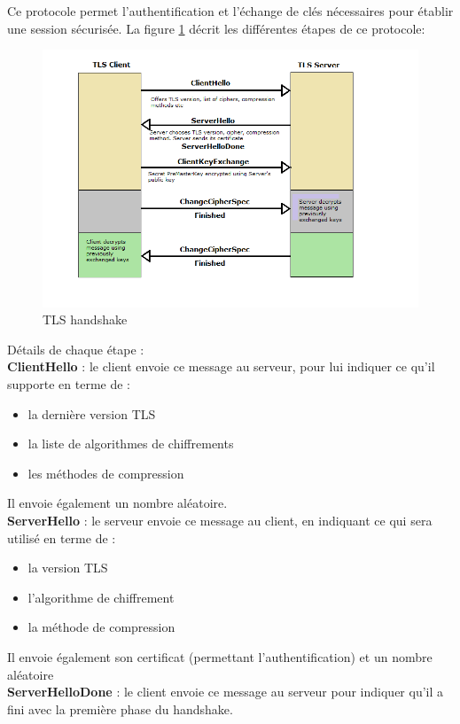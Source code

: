 Ce protocole permet l'authentification et l'échange de clés nécessaires pour établir une session sécurisée. La figure \ref{handshake} décrit les différentes étapes de ce protocole:
\begin{figure}[H]
  \centering
  \includegraphics[scale=0.8]{img/tls-handshake.png}
  \caption{TLS handshake}
  \label{handshake}
\end{figure}  

Détails de chaque étape :\\


\textbf{ClientHello} : le client envoie ce message au serveur, pour lui indiquer ce qu'il supporte en terme de  :
\begin{itemize}
\item la dernière version TLS 
\item la liste de algorithmes de chiffrements  
\item les méthodes de compression
\end{itemize}
Il envoie également un nombre aléatoire.\\


\textbf{ServerHello} : le serveur envoie ce message au client, en indiquant ce qui sera utilisé en terme de : 
\begin{itemize}
\item la version TLS
\item l'algorithme de chiffrement
\item la méthode de compression
\end{itemize}
Il envoie également son certificat (permettant l'authentification) et un nombre aléatoire\\

\textbf{ServerHelloDone} : le client envoie ce message au serveur pour indiquer qu'il a fini avec la première phase du handshake.\\

